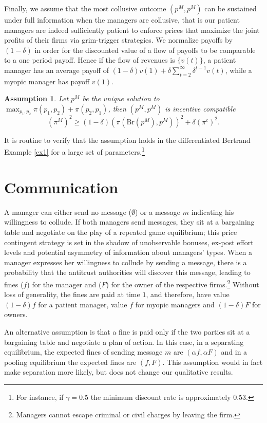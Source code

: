 \documentclass[]{article}
\newcommand{\B}{\mbox{Br}}
\newtheorem{assumption}{Assumption}
\begin{document}
Finally, we assume that the most collusive outcome $(p^M,p^M)$ can be sustained under full information when the managers are collusive, that is our patient managers are indeed sufficiently patient to enforce prices that maximize the joint profits of their firms via grim-trigger strategies. We normalize payoffs by $(1-\delta)$ in order for the discounted value of a flow of payoffs to be comparable to a one period payoff. Hence if the flow of revenues is $\{v(t)\}$, a patient manager has an average payoff of $(1-\delta)v(1)+\delta \sum_{t=2}^\infty \delta^{t-1}v(t)$, while a myopic manager has payoff $v(1)$. 
%
\begin{assumption}\label{ass:patient}
		Let $p^M$ be the unique solution to $\max_{p_1,p_2}\pi(p_1,p_2)+\pi(p_2,p_1)$, then $(p^M,p^M)$ is incentive compatible
	\[(\pi^M)^2\geq (1-\delta)(\pi(\B(p^M),p^M))^2+\delta (\pi^c)^2.\]
\end{assumption}
%
It is routine to verify that the assumption holds in the differentiated Bertrand Example \ref{ex1} for a large set of parameters.\footnote{%
For instance, if $\gamma=0.5$ the minimum discount rate is approximately $0.53$.
}
\section{Communication} \label{sec:communication}
A manager can either send no message ($\emptyset$) or a message $m$ indicating his willingness to collude. If both managers send messages, they sit at a bargaining table and negotiate on the play of a repeated game equilibrium; this price contingent strategy is set in the shadow of unobservable bonuses, ex-post effort levels and potential asymmetry of information about managers' types. When a manager expresses her willingness to collude by sending a message, there is a probability that the antitrust authorities will discover this message, leading to fines ($f$) for the manager and ($F$) for the owner of the respective firms.\footnote{Managers cannot escape criminal or civil charges by leaving the firm.} Without loss of generality, the fines are paid at time $1$, and therefore, have value $(1-\delta)f$ for a patient manager, value $f$ for myopic managers and $(1-\delta)F$ for owners.

An alternative assumption is that a fine is paid only if the two parties sit at a bargaining table and negotiate a plan of action. In this case, in a separating equilibrium, the expected fines of sending message $m$ are $(\alpha f,\alpha F)$ and in a pooling equilibrium the expected fines are $(f,F)$. This assumption would in fact make separation more likely, but does not change our qualitative results.
\end{document}
